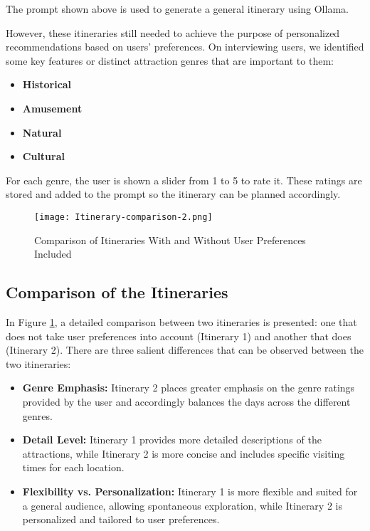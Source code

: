 \documentclass[final,1p,times]{elsarticle}
\begin{document}
        The prompt shown above is used to generate a general itinerary using Ollama.
        
        However, these itineraries still needed to achieve the purpose of personalized recommendations based on users' preferences. On interviewing users, we identified some key features or distinct attraction genres that are important to them:
        
        \begin{itemize}[noitemsep, topsep=5pt, parsep=0pt, partopsep=0pt]
            \item \textbf{Historical}
            \item \textbf{Amusement}
            \item \textbf{Natural}
            \item \textbf{Cultural}
        \end{itemize}
        
        For each genre, the user is shown a slider from 1 to 5 to rate it. These ratings are stored and added to the prompt so the itinerary can be planned accordingly.
    
    
    \begin{figure}[H]
        \centering
        \texttt{[image: Itinerary-comparison-2.png]}
        \caption{Comparison of Itineraries With and Without User Preferences Included}
        \label{fig:itinerary_comparison}
    \end{figure}
    
    \subsection{Comparison of the Itineraries}
        
        In Figure \ref{fig:itinerary_comparison}, a detailed comparison between two itineraries is presented: one that does not take user preferences into account (Itinerary 1) and another that does (Itinerary 2). There are three salient differences that can be observed between the two itineraries:
    
        \begin{itemize}[noitemsep, topsep=5pt, parsep=0pt, partopsep=0pt]
        \item \textbf{Genre Emphasis:} Itinerary 2 places greater emphasis on the genre ratings provided by the user and accordingly balances the days across the different genres.
        
        \item \textbf{Detail Level:} Itinerary 1 provides more detailed descriptions of the attractions, while Itinerary 2 is more concise and includes specific visiting times for each location.
        
        \item \textbf{Flexibility vs. Personalization:} Itinerary 1 is more flexible and suited for a general audience, allowing spontaneous exploration, while Itinerary 2 is personalized and tailored to user preferences.
        \end{itemize}
        
\end{document}
